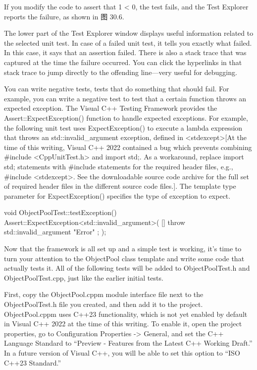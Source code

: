 
If you modify the code to assert that 1 < 0, the test fails, and the Test Explorer reports the failure, as shown in 图 30.6.


The lower part of the Test Explorer window displays useful information related to the selected unit test. In case of a failed unit test, it tells you exactly what failed. In this case, it says that an assertion failed. There is also a stack trace that was captured at the time the failure occurred. You can click the hyperlinks in that stack trace to jump directly to the offending line—very useful for debugging.


You can write negative tests, tests that do something that should fail. For example, you can write a negative test to test that a certain function throws an expected exception. The Visual C++ Testing Framework provides the Assert::ExpectException() function to handle expected exceptions. For example, the following unit test uses ExpectException() to execute a lambda expression that throws an std::invalid\_argument exception, defined in <stdexcept>[At the time of this writing, Visual C++ 2022 contained a bug which prevents combining \#include <CppUnitTest.h> and import std;. As a workaround, replace import std; statements with \#include statements for the required header files, e.g., \#include <stdexcept>. See the downloadable source code archive for the full set of required header files in the different source code files.]. The template type parameter for ExpectException() specifies the type of exception to expect.

\begin{cpp}
void ObjectPoolTest::testException()
{
    Assert::ExpectException<std::invalid_argument>(
        []{ throw std::invalid_argument { "Error" }; });
}
\end{cpp}


Now that the framework is all set up and a simple test is working, it’s time to turn your attention to the ObjectPool class template and write some code that actually tests it. All of the following tests will be added to ObjectPoolTest.h and ObjectPoolTest.cpp, just like the earlier initial tests.

First, copy the ObjectPool.cppm module interface file next to the ObjectPoolTest.h file you created, and then add it to the project. ObjectPool.cppm uses C++23 functionality, which is not yet enabled by default in Visual C++ 2022 at the time of this writing. To enable it, open the project properties, go to Configuration Properties -> General, and set the C++ Language Standard to “Preview - Features from the Latest C++ Working Draft.” In a future version of Visual C++, you will be able to set this option to “ISO C++23 Standard.”

